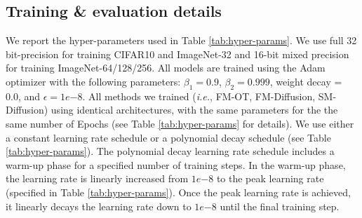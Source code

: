 \documentclass{article}
\makeatletter
\newcommand{\ie}{{i.e.}}
\renewcommand*{\ie}{{\it i.e.}\@\xspace}
\makeatother
\begin{document}
\subsection{Training \& evaluation details}

\begin{table}
\centering
{}
\caption{Hyper-parameters used for training each model}
\label{tab:hyper-params}
\end{table}

We report the hyper-parameters used in Table \ref{tab:hyper-params}.  We use full 32 bit-precision for training CIFAR10 and ImageNet-32 and 16-bit mixed precision for training ImageNet-64/128/256.  All models are trained using the Adam optimizer with the following parameters: $\beta_1 = 0.9$, $\beta_2=0.999$, weight decay = 0.0, and $\epsilon = 1e{-8}$. All methods we trained (\ie, FM-OT, FM-Diffusion, SM-Diffusion) using  identical architectures, with the same parameters for the the same number of Epochs (see Table \ref{tab:hyper-params} for details).  We use either a constant learning rate schedule or a polynomial decay schedule (see Table \ref{tab:hyper-params}).  The polynomial decay learning rate schedule includes a warm-up phase for a specified number of training steps.  In the warm-up phase, the learning rate is linearly increased from $1e{-8}$ to the peak learning rate (specified in Table \ref{tab:hyper-params}).  Once the peak learning rate is achieved, it linearly decays the learning rate down to $1e{-8}$ until the final training step.
\end{document}
